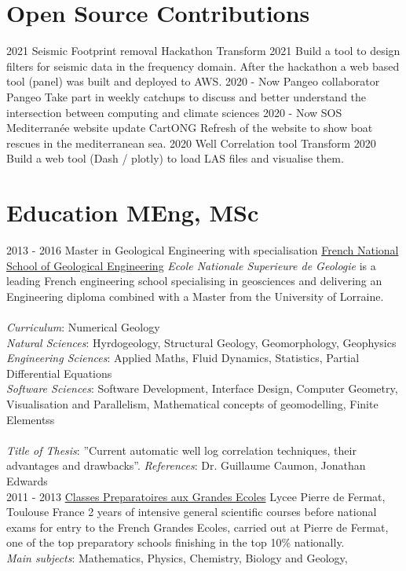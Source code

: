 \documentclass[]{friggeri-cv}
\begin{document}
\section{Open Source Contributions}
\begin{entrylist}
	\entry
	{2021}
	{Seismic Footprint removal Hackathon}
	{Transform 2021}
	{Build a tool to design filters for seismic data in the frequency domain. After the hackathon a web based tool (panel) was built and deployed to AWS.}
	\entry
	{2020 - Now}
	{Pangeo collaborator}
	{Pangeo}
	{Take part in weekly catchups to discuss and better understand the intersection between computing and climate sciences}
	\entry
	{2020 - Now}
	{SOS Mediterranée website update}
	{CartONG}
	{Refresh of the website to show boat rescues in the mediterranean sea.}
	\entry
	{2020}
	{Well Correlation tool}
	{Transform 2020}
	{Build a web tool (Dash / plotly) to load LAS files and visualise them.}
\end{entrylist}
\section{Education MEng, MSc}
\begin{entrylist}
  \entry
    {2013 - 2016}
    {Master in Geological Engineering with specialisation}
    {\href{http://ensg.univ-lorraine.fr/english/}{French National School of Geological Engineering}}
    {\emph{Ecole Nationale Superieure de Geologie} is a leading French engineering school specialising in geosciences and delivering an Engineering diploma combined with a Master from the University of Lorraine.\\ 
    \\
    \emph{Curriculum}: Numerical Geology\\ 
    \emph{Natural Sciences}: Hyrdogeology, Structural Geology, Geomorphology, Geophysics\\
    \emph{Engineering Sciences}: Applied Maths, Fluid Dynamics, Statistics, Partial Differential Equations\\
    \emph{Software Sciences}:  Software Development, Interface Design, Computer Geometry, Visualisation and Parallelism, Mathematical concepts of geomodelling, Finite Elementss\\
    \\
    \emph{Title of Thesis}: ”Current automatic well log correlation techniques, their advantages and drawbacks”.
    \emph{References}: Dr. Guillaume Caumon, Jonathan Edwards\\}
  \entry
    {2011 - 2013}
    {\href{https://en.wikipedia.org/wiki/Classe_preparatoire_aux_grandes_ecoles}{Classes Preparatoires aux Grandes Ecoles}}
    {Lycee Pierre de Fermat, Toulouse France}
    {2 years of intensive general scientific courses before national exams for entry to the French Grandes Ecoles, carried out at Pierre de Fermat, one of the top preparatory schools finishing in the top 10\% nationally.\\ 
    \emph{Main subjects}: Mathematics, Physics, Chemistry, Biology and Geology, \\}
\end{entrylist}
\vspace*{\fill}
\end{document}
